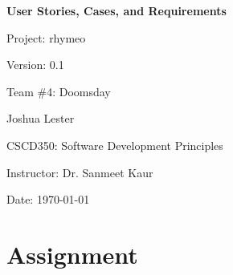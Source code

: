 \documentclass[12pt,a4paper]{report}
\begin{document}
\begin{titlepage}
    \centering
    \vspace*{2cm}
    {\Huge\bfseries User Stories, Cases, and Requirements \par}
    \vspace{2cm}
    {\Large Project: rhymeo \par}
    \vspace{0.5cm}
    {\Large Version: 0.1 \par}
    \vspace{0.5cm}
    {\Large Team \#4: Doomsday \par}
    \vspace{0.5cm}
    {\Large Joshua Lester\par}
    \vspace{0.5cm}
    {\large CSCD350: Software Development Principles \par}
    \vspace{0.5cm}
    {\Large Instructor: Dr. Sanmeet Kaur \par}
    \vspace{0.5cm}
    \vfill
    {\Large Date: \today \par}
\end{titlepage}

\chapter{Assignment}
\end{document}
